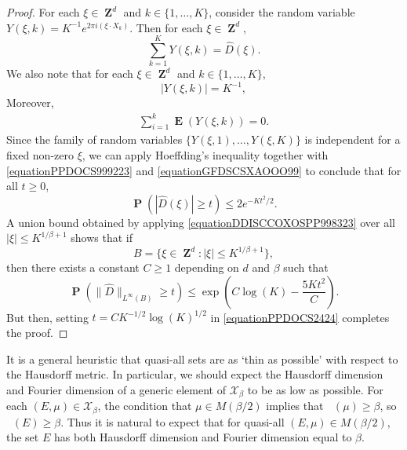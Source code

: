 \documentclass[12pt,reqno]{article}
\numberwithin{equation}{section}
\DeclareMathOperator{\fordim}{\dim_{\mathbf{F}}}
\DeclareMathOperator{\ZZ}{\mathbf{Z}}
\DeclareMathOperator{\EE}{\mathbf{E}}
\DeclareMathOperator{\PP}{\mathbf{P}}
\begin{document}
\begin{proof}
    For each $\xi \in \ZZ^d$ and $k \in \{ 1, \dots, K \}$, consider the random variable $Y(\xi,k) = K^{-1} e^{2 \pi i (\xi \cdot X_k)}$. Then for each $\xi \in \ZZ^d$,
    \begin{equation} \label{equationPPDOCS999223}
        \sum_{k = 1}^K Y(\xi,k) = \widehat{D}(\xi).
    \end{equation}
    We also note that for each $\xi \in \ZZ^d$ and $k \in \{ 1, \dots, K \}$,
    \begin{equation} \label{equationGFDSCSXAOOO99}
        |Y(\xi,k)| = K^{-1},
    \end{equation}
    Moreover,
    \begin{equation} \label{equationDOIJWIJCCCCC5555322}
    \begin{split}
        \sum_{i = 1}^k \EE(Y(\xi,k)) = 0.
    \end{split}
    \end{equation}
    Since the family of random variables $\{ Y(\xi,1), \dots, Y(\xi,K) \}$ is independent for a fixed non-zero $\xi$, we can apply Hoeffding's inequality together with \eqref{equationPPDOCS999223} and \eqref{equationGFDSCSXAOOO99} to conclude that for all $t \geq 0$,
    \begin{equation} \label{equationDDISCCOXOSPP998323}
        \PP \left( |\widehat{D}(\xi)| \geq t \right) \leq 2 e^{-Kt^2/2}.
    \end{equation}
    A union bound obtained by applying \eqref{equationDDISCCOXOSPP998323} over all $|\xi| \leq K^{1/\beta+1}$ shows that if
    \[ B = \{ \xi \in \ZZ^d : |\xi| \leq K^{1/\beta + 1} \}, \]
    then there exists a constant $C \geq 1$ depending on $d$ and $\beta$ such that
    \begin{equation} \label{equationPPDOCS2424}
        \PP \left( \| \widehat{D} \|_{L^\infty(B)} \geq t \right) \leq \exp \left( C \log(K) - \frac{5K t^2}{C} \right).
    \end{equation}
    But then, setting $t = CK^{-1/2} \log(K)^{1/2}$ in \eqref{equationPPDOCS2424} completes the proof.
\end{proof}

It is a general heuristic that quasi-all sets are as `thin as possible' with respect to the Hausdorff metric. In particular, we should expect the Hausdorff dimension and Fourier dimension of a generic element of $\mathcal{X}_\beta$ to be as low as possible. For each $(E,\mu) \in \mathcal{X}_\beta$, the condition that $\mu \in M(\beta/2)$ implies that $\fordim(\mu) \geq \beta$, so $\fordim(E) \geq \beta$. Thus it is natural to expect that for quasi-all $(E,\mu) \in M(\beta/2)$, the set $E$ has both Hausdorff dimension and Fourier dimension equal to $\beta$.
\end{document}

